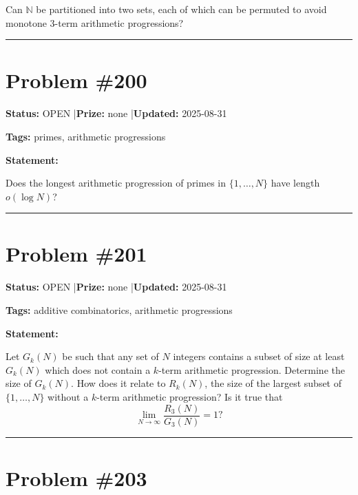 \documentclass{article}
\begin{document}
Can $\mathbb{N}$ be partitioned into two sets, each of which can be permuted to avoid monotone 3-term arithmetic progressions?

\noindent\rule{\linewidth}{0.4pt}


\section{Problem \#200}
\label{prob:200}

\noindent\textbf{Status:} OPEN \quad|\quad \textbf{Prize:} none \quad|\quad \textbf{Updated:} 2025-08-31

\noindent\textbf{Tags:} primes, arithmetic progressions

\medskip

\noindent\textbf{Statement:}

Does the longest arithmetic progression of primes in $\{1,\ldots,N\}$ have length $o(\log N)$?

\noindent\rule{\linewidth}{0.4pt}


\section{Problem \#201}
\label{prob:201}

\noindent\textbf{Status:} OPEN \quad|\quad \textbf{Prize:} none \quad|\quad \textbf{Updated:} 2025-08-31

\noindent\textbf{Tags:} additive combinatorics, arithmetic progressions

\medskip

\noindent\textbf{Statement:}

Let $G_k(N)$ be such that any set of $N$ integers contains a subset of size at least $G_k(N)$ which does not contain a $k$-term arithmetic progression. Determine the size of $G_k(N)$. How does it relate to $R_k(N)$, the size of the largest subset of $\{1,\ldots,N\}$ without a $k$-term arithmetic progression? Is it true that\[\lim_{N\to \infty}\frac{R_3(N)}{G_3(N)}=1?\]

\noindent\rule{\linewidth}{0.4pt}


\section{Problem \#203}
\label{prob:203}
\end{document}
